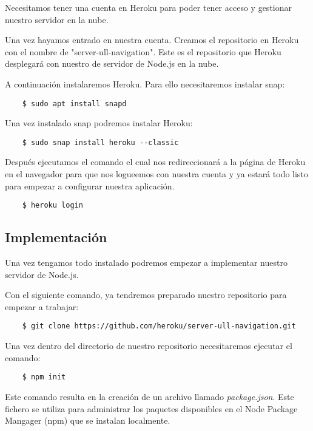 Necesitamos tener una cuenta en Heroku para poder tener acceso y gestionar nuestro servidor en la nube.

Una vez hayamos entrado en nuestra cuenta. Creamos el repositorio en Heroku con el nombre de "server-ull-navigation". Este es el repositorio que Heroku desplegará con nuestro de servidor de Node.js en la nube.

A continuación instalaremos Heroku. Para ello necesitaremos instalar snap:

\begin{lstlisting}
	$ sudo apt install snapd
\end{lstlisting}

Una vez instalado snap podremos instalar Heroku:

\begin{lstlisting}
	$ sudo snap install heroku --classic
\end{lstlisting}

Después ejecutamos el comando  el cual nos redireccionará a la página de Heroku en el navegador para que nos logueemos con nuestra cuenta y ya estará todo listo para empezar a configurar nuestra aplicación.

\begin{lstlisting}
	$ heroku login
\end{lstlisting}


\subsection{Implementación}

Una vez tengamos todo instalado podremos empezar a implementar nuestro servidor de Node.js.

Con el siguiente comando, ya tendremos preparado nuestro repositorio para empezar a trabajar:

\begin{lstlisting}
	$ git clone https://github.com/heroku/server-ull-navigation.git
\end{lstlisting}

Una vez dentro del directorio de nuestro repositorio necesitaremos ejecutar el comando:
\begin{lstlisting}
    $ npm init
\end{lstlisting}

Este comando resulta en la creación de un archivo llamado \textit{package.json}. Este fichero se utiliza para administrar los paquetes disponibles en el Node Package Mangager (npm) que se instalan localmente.

